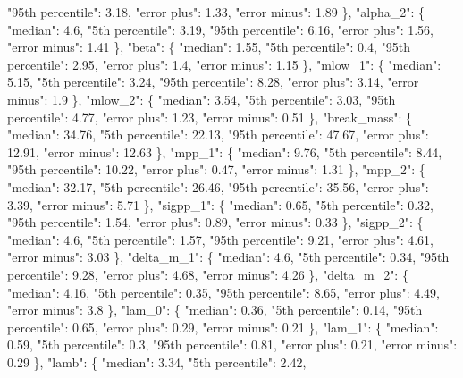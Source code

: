 {{        "95th percentile": 3.18, %
        "error plus": 1.33, %
        "error minus": 1.89%
      \}, %
      "alpha\_2": \{%
        "median": 4.6, %
        "5th percentile": 3.19, %
        "95th percentile": 6.16, %
        "error plus": 1.56, %
        "error minus": 1.41%
      \}, %
      "beta": \{%
        "median": 1.55, %
        "5th percentile": 0.4, %
        "95th percentile": 2.95, %
        "error plus": 1.4, %
        "error minus": 1.15%
      \}, %
      "mlow\_1": \{%
        "median": 5.15, %
        "5th percentile": 3.24, %
        "95th percentile": 8.28, %
        "error plus": 3.14, %
        "error minus": 1.9%
      \}, %
      "mlow\_2": \{%
        "median": 3.54, %
        "5th percentile": 3.03, %
        "95th percentile": 4.77, %
        "error plus": 1.23, %
        "error minus": 0.51%
      \}, %
      "break\_mass": \{%
        "median": 34.76, %
        "5th percentile": 22.13, %
        "95th percentile": 47.67, %
        "error plus": 12.91, %
        "error minus": 12.63%
      \}, %
      "mpp\_1": \{%
        "median": 9.76, %
        "5th percentile": 8.44, %
        "95th percentile": 10.22, %
        "error plus": 0.47, %
        "error minus": 1.31%
      \}, %
      "mpp\_2": \{%
        "median": 32.17, %
        "5th percentile": 26.46, %
        "95th percentile": 35.56, %
        "error plus": 3.39, %
        "error minus": 5.71%
      \}, %
      "sigpp\_1": \{%
        "median": 0.65, %
        "5th percentile": 0.32, %
        "95th percentile": 1.54, %
        "error plus": 0.89, %
        "error minus": 0.33%
      \}, %
      "sigpp\_2": \{%
        "median": 4.6, %
        "5th percentile": 1.57, %
        "95th percentile": 9.21, %
        "error plus": 4.61, %
        "error minus": 3.03%
      \}, %
      "delta\_m\_1": \{%
        "median": 4.6, %
        "5th percentile": 0.34, %
        "95th percentile": 9.28, %
        "error plus": 4.68, %
        "error minus": 4.26%
      \}, %
      "delta\_m\_2": \{%
        "median": 4.16, %
        "5th percentile": 0.35, %
        "95th percentile": 8.65, %
        "error plus": 4.49, %
        "error minus": 3.8%
      \}, %
      "lam\_0": \{%
        "median": 0.36, %
        "5th percentile": 0.14, %
        "95th percentile": 0.65, %
        "error plus": 0.29, %
        "error minus": 0.21%
      \}, %
      "lam\_1": \{%
        "median": 0.59, %
        "5th percentile": 0.3, %
        "95th percentile": 0.81, %
        "error plus": 0.21, %
        "error minus": 0.29%
      \}, %
      "lamb": \{%
        "median": 3.34, %
        "5th percentile": 2.42, %
}}
